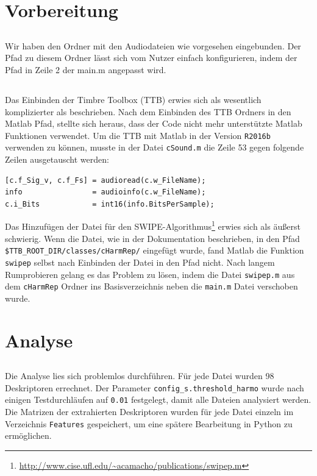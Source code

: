 \section{Vorbereitung}
\label{sec:preperation}

\subsection{}
Wir haben den Ordner mit den Audiodateien wie vorgesehen eingebunden.
Der Pfad zu diesem Ordner lässt sich vom Nutzer einfach konfigurieren, indem der Pfad in Zeile 2 der main.m angepasst wird.

\subsection{}
Das Einbinden der Timbre Toolbox (TTB) erwies sich als wesentlich komplizierter als beschrieben.
Nach dem Einbinden des TTB Ordners in den Matlab Pfad, stellte sich heraus, dass der Code nicht mehr unterstützte Matlab Funktionen verwendet.
Um die TTB mit Matlab in der Version \texttt{R2016b} verwenden zu können, musste in der Datei \texttt{cSound.m} die Zeile 53 gegen folgende Zeilen ausgetauscht werden:

\begin{lstlisting}
[c.f_Sig_v, c.f_Fs] = audioread(c.w_FileName);
info                = audioinfo(c.w_FileName);
c.i_Bits            = int16(info.BitsPerSample);
\end{lstlisting}

Das Hinzufügen der Datei für den SWIPE-Algorithmus\footnote{\url{http://www.cise.ufl.edu/~acamacho/publications/swipep.m}} erwies sich als äußerst schwierig.
Wenn die Datei, wie in der Dokumentation beschrieben, in den Pfad \texttt{\$TTB\_ROOT\_DIR/classes/cHarmRep/} eingefügt wurde, fand Matlab die Funktion \texttt{swipep} selbst nach Einbinden der Datei in den Pfad nicht.
Nach langem Rumprobieren gelang es das Problem zu lösen, indem die Datei \texttt{swipep.m} aus dem \texttt{cHarmRep} Ordner ins Basisverzeichnis neben die \texttt{main.m} Datei verschoben wurde.

\section{Analyse}
\label{sec:analyse}

\subsection{}
Die Analyse lies sich problemlos durchführen.
Für jede Datei wurden 98 Deskriptoren errechnet.	
Der Parameter \texttt{config\_s.threshold\_harmo} wurde nach einigen Testdurchläufen auf \texttt{0.01} festgelegt, damit alle Dateien analysiert werden.
Die Matrizen der extrahierten Deskriptoren wurden für jede Datei einzeln im Verzeichnis \texttt{Features} gespeichert, um eine spätere Bearbeitung in Python zu ermöglichen. 


